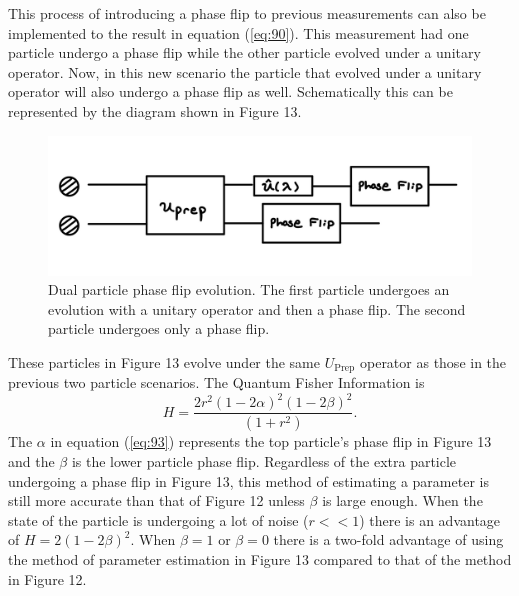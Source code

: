 \documentclass[twocolumn]{article}
\begin{document}
This process of introducing a phase flip to previous measurements can also be implemented to the result in equation (\ref{eq:90}). This measurement had one particle undergo a phase flip while the other particle evolved under a unitary operator. Now, in this new scenario the particle that evolved under a unitary operator will also undergo a phase flip as well. Schematically this can be represented by the diagram shown in Figure 13.
\begin{figure}[h]
\begin{center}
\includegraphics[width=0.70\linewidth]{TP-Dual-Phase-Flip.PNG}
\caption{Dual particle phase flip evolution. The first particle undergoes an evolution with a unitary operator and then a phase flip. The second particle undergoes only a phase flip.}
\end{center}
\end{figure}
\newpage
These particles in Figure 13 evolve under the same $U_{\text{Prep}}$ operator as those in the previous two particle scenarios. The Quantum Fisher Information is
\begin{equation}\label{eq:93}
H=\frac{2r^2(1-2\alpha)^2(1-2\beta)^2}{(1+r^2)}.
\end{equation}
The $\alpha$ in equation (\ref{eq:93}) represents the top particle's phase flip in Figure 13 and the $\beta$ is the lower particle phase flip. Regardless of the extra particle undergoing a phase flip in Figure 13, this method of estimating a parameter is still more accurate than that of Figure 12 unless $\beta$ is large enough. When the state of the particle is undergoing a lot of noise ($r<<1$) there is an advantage of $H=2(1-2\beta)^2$. When $\beta=1$ or $\beta=0$ there is a two-fold advantage of using the method of parameter estimation in Figure 13 compared to that of the method in Figure 12.
\end{document}

